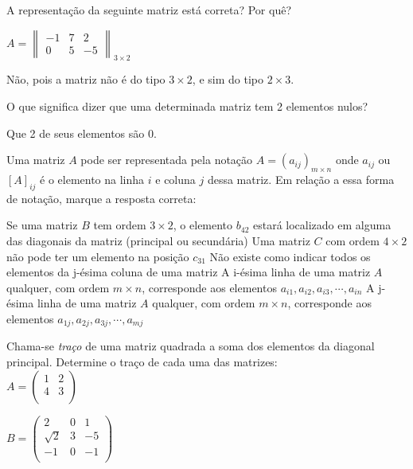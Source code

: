 \documentclass[pdftex, brazil, 12pt, oneside, addpoints]{exam}
\begin{document}
\begin{questions}
\question
A representação da seguinte matriz está correta? Por quê?

$A = \begin{Vmatrix}
  -1 & 7 & 2\\
  0 & 5 & -5\end{Vmatrix}_{3 \times 2}$
\begin{solutionorlines}[0.50in]
  Não, pois a matriz não é do tipo $3 \times 2$, e sim do tipo
  $2 \times 3$.
\end{solutionorlines}

\question
O que significa dizer que uma determinada matriz tem 2 elementos nulos?
\begin{solutionorlines}[0.50in]
  Que 2 de seus elementos são $0$.
\end{solutionorlines}

\question
Uma matriz $A$ pode ser representada pela notação $A = (a_{ij})_{m \times n}$
onde $a_{ij}$ ou $[A]_{ij}$ é o elemento na linha $i$ e coluna $j$ dessa
matriz. Em relação a essa forma de notação, marque a resposta correta:
\begin{checkboxes}
  \choice Se uma matriz $B$ tem ordem $3 \times 2$, o elemento $b_{42}$ estará
  localizado em alguma das diagonais da matriz (principal ou secundária)
  \choice Uma matriz $C$ com ordem $4 \times 2$ não pode ter um elemento
  na posição $c_{31}$
  \choice Não existe como indicar todos os elementos da j-ésima coluna de uma matriz
  \CorrectChoice A i-ésima linha de uma matriz $A$ qualquer, com ordem $m \times n$, corresponde aos
  elementos $a_{i1}, a_{i2}, a_{i3}, \cdots, a_{in}$
  \choice A j-ésima linha de uma matriz $A$ qualquer, com ordem $m \times n$, corresponde aos
  elementos $a_{1j}, a_{2j}, a_{3j}, \cdots, a_{mj}$
\end{checkboxes}

\question
Chama-se \emph{traço} de uma matriz quadrada a soma dos elementos da
diagonal principal. Determine o traço de cada uma das matrizes:\\%
$A = \begin{pmatrix}
  1 & 2\\
  4 & 3\\
\end{pmatrix}$

$B = \begin{pmatrix}
  2 & 0 & 1\\
  \sqrt{2} & 3 & -5\\
  -1 & 0 & -1\\
\end{pmatrix}$


\end{questions}
\end{document}
